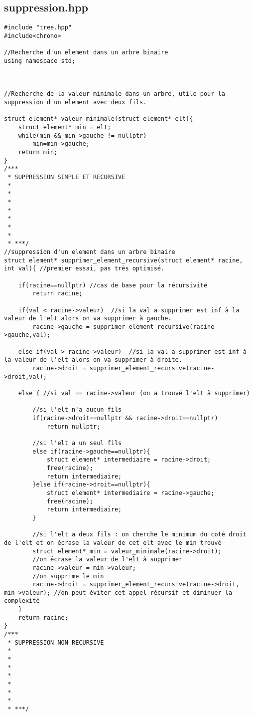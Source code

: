 \subsection{suppression.hpp}
\begin{verbatim}
#include "tree.hpp"
#include<chrono>

//Recherche d'un element dans un arbre binaire 
using namespace std;



//Recherche de la valeur minimale dans un arbre, utile pour la suppression d'un element avec deux fils.

struct element* valeur_minimale(struct element* elt){
    struct element* min = elt;
    while(min && min->gauche != nullptr)
        min=min->gauche;
    return min;
}
/***
 * SUPPRESSION SIMPLE ET RECURSIVE
 * 
 * 
 * 
 * 
 * 
 * 
 * 
 * ***/
//suppression d'un element dans un arbre binaire 
struct element* supprimer_element_recursive(struct element* racine, int val){ //premier essai, pas très optimisé.
   
    if(racine==nullptr) //cas de base pour la récursivité
        return racine; 

    if(val < racine->valeur)  //si la val a supprimer est inf à la valeur de l'elt alors on va supprimer à gauche.
        racine->gauche = supprimer_element_recursive(racine->gauche,val);

    else if(val > racine->valeur)  //si la val a supprimer est inf à la valeur de l'elt alors on va supprimer à droite.
        racine->droit = supprimer_element_recursive(racine->droit,val);

    else { //si val == racine->valeur (on a trouvé l'elt à supprimer)

        //si l'elt n'a aucun fils
        if(racine->droit==nullptr && racine->droit==nullptr)
            return nullptr;

        //si l'elt a un seul fils
        else if(racine->gauche==nullptr){
            struct element* intermediaire = racine->droit;
            free(racine);
            return intermediaire;
        }else if(racine->droit==nullptr){
            struct element* intermediaire = racine->gauche;
            free(racine);
            return intermediaire;
        }

        //si l'elt a deux fils : on cherche le minimum du coté droit de l'elt et on écrase la valeur de cet elt avec le min trouvé
        struct element* min = valeur_minimale(racine->droit);
        //on écrase la valeur de l'elt à supprimer
        racine->valeur = min->valeur;
        //on supprime le min
        racine->droit = supprimer_element_recursive(racine->droit, min->valeur); //on peut éviter cet appel récursif et diminuer la complexité
    }
    return racine;
}
/***
 * SUPPRESSION NON RECURSIVE
 * 
 * 
 * 
 * 
 * 
 * 
 * 
 * ***/



\end{verbatim}
